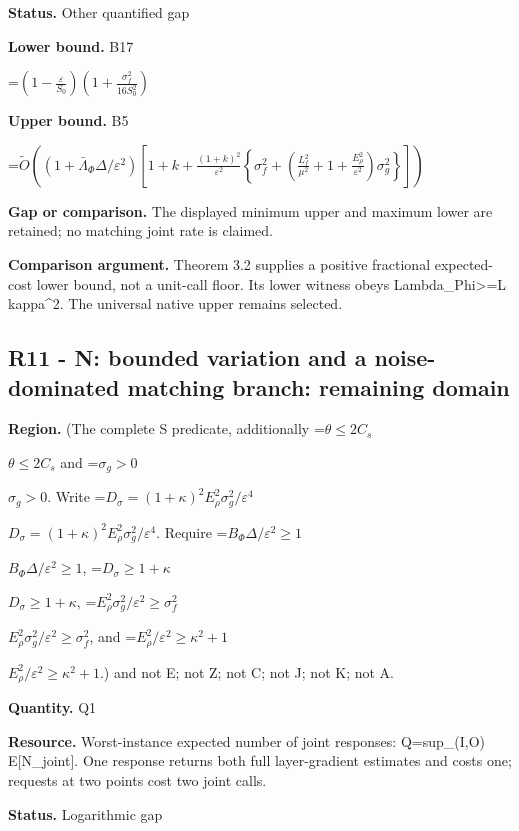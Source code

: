 \documentclass[10pt,a4paper]{article}
\newcommand{\AtlasMath}[1]{\par\begingroup\centering\setbox0=\hbox{$\displaystyle #1$}\ifdim\wd0>1.4\linewidth\typeout{ATLAS WIDE FORMULA: \the\wd0}\fi\ifdim\wd0>\linewidth\resizebox{\linewidth}{!}{\box0}\else\box0\fi\par\endgroup}
\newcommand{\AtlasInlineMath}[1]{\begingroup\setbox0=\hbox{$#1$}\ifdim\wd0>.4\linewidth\endgroup\AtlasMath{#1}\else\endgroup$#1$\fi}
\begin{document}
\textbf{Status.} Other quantified gap



\textbf{Lower bound.} B17



\AtlasMath{\left(1-\frac{\varepsilon}{S_0}\right)\left(1+\frac{\sigma_f^2}{16S_0^2}\right)}


\textbf{Upper bound.} B5



\AtlasMath{\widetilde O\!\left((1+\bar\Lambda_\Phi\Delta/\varepsilon^2)\left[1+k+\frac{(1+k)^2}{\varepsilon^2}\left\{\sigma_f^2+\left(\frac{L_f^2}{\mu^2}+1+\frac{E_\rho^2}{\varepsilon^2}\right)\sigma_g^2\right\}\right]\right)}


\textbf{Gap or comparison.} The displayed minimum upper and maximum lower are retained; no matching joint rate is claimed.



\textbf{Comparison argument.} Theorem 3.2 supplies a positive fractional expected-cost lower bound, not a unit-call floor. Its lower witness obeys Lambda\_Phi>=L kappa\textasciicircum{}2. The universal native upper remains selected.



\subsection{R11 - N: bounded variation and a noise-dominated matching branch: remaining domain}


\textbf{Region.} (The complete S predicate, additionally \AtlasInlineMath{\theta\le2C_s} and \AtlasInlineMath{\sigma_g>0}. Write \AtlasInlineMath{D_\sigma=(1+\kappa)^2 E_\rho^2\sigma_g^2/\varepsilon^4}. Require \AtlasInlineMath{B_\Phi\Delta/\varepsilon^2\ge1}, \AtlasInlineMath{D_\sigma\ge1+\kappa}, \AtlasInlineMath{E_\rho^2\sigma_g^2/\varepsilon^2\ge\sigma_f^2}, and \AtlasInlineMath{E_\rho^2/\varepsilon^2\ge\kappa^2+1}.) and not E; not Z; not C; not J; not K; not A.



\textbf{Quantity.} Q1



\textbf{Resource.} Worst-instance expected number of joint responses: Q=sup\_(I,O) E[N\_joint]. One response returns both full layer-gradient estimates and costs one; requests at two points cost two joint calls.



\textbf{Status.} Logarithmic gap
\end{document}
